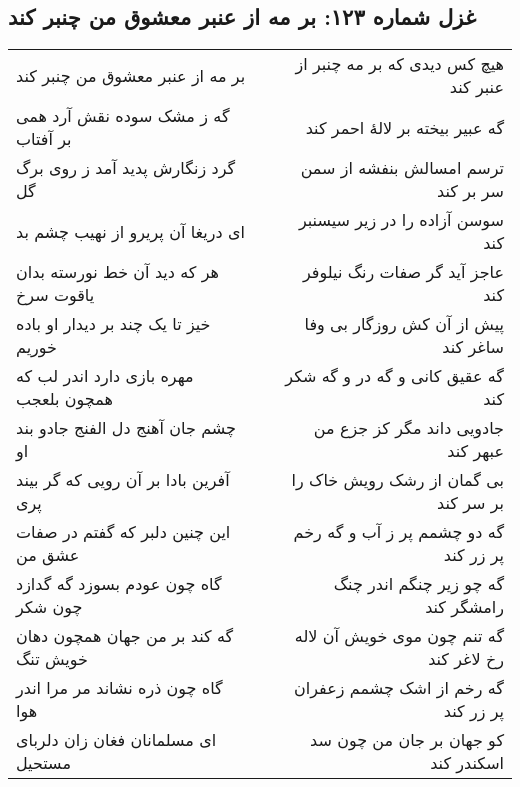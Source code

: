 \begin{center}
\section*{غزل شماره ۱۲۳: بر مه از عنبر معشوق من چنبر کند}
\label{sec:123}
\begin{longtable}{l p{0.5cm} r}
بر مه از عنبر معشوق من چنبر کند
&&
هیچ کس دیدی که بر مه چنبر از عنبر کند
\\
گه ز مشک سوده نقش آرد همی بر آفتاب
&&
گه عبیر بیخته بر لالهٔ احمر کند
\\
گرد زنگارش پدید آمد ز روی برگ گل
&&
ترسم امسالش بنفشه از سمن سر بر کند
\\
ای دریغا آن پریرو از نهیب چشم بد
&&
سوسن آزاده را در زیر سیسنبر کند
\\
هر که دید آن خط نورسته بدان یاقوت سرخ
&&
عاجز آید گر صفات رنگ نیلوفر کند
\\
خیز تا یک چند بر دیدار او باده خوریم
&&
پیش از آن کش روزگار بی وفا ساغر کند
\\
مهره بازی دارد اندر لب که همچون بلعجب
&&
گه عقیق کانی و گه در و گه شکر کند
\\
چشم جان آهنج دل الفنج جادو بند او
&&
جادویی داند مگر کز جزع من عبهر کند
\\
آفرین بادا بر آن رویی که گر بیند پری
&&
بی گمان از رشک رویش خاک را بر سر کند
\\
این چنین دلبر که گفتم در صفات عشق من
&&
گه دو چشمم پر ز آب و گه رخم پر زر کند
\\
گاه چون عودم بسوزد گه گدازد چون شکر
&&
گه چو زیر چنگم اندر چنگ رامشگر کند
\\
گه کند بر من جهان همچون دهان خویش تنگ
&&
گه تنم چون موی خویش آن لاله رخ لاغر کند
\\
گاه چون ذره نشاند مر مرا اندر هوا
&&
گه رخم از اشک چشمم زعفران پر زر کند
\\
ای مسلمانان فغان زان دلربای مستحیل
&&
کو جهان بر جان من چون سد اسکندر کند
\\
\end{longtable}
\end{center}
